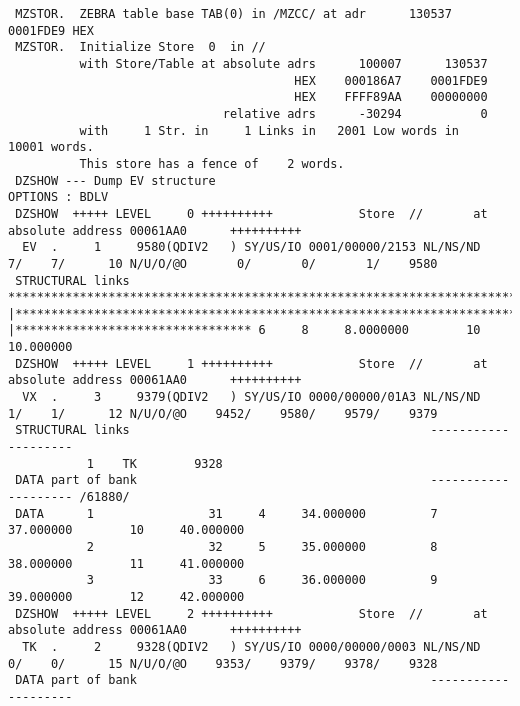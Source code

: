 \begin{Listing}\begin{verbatim}
 MZSTOR.  ZEBRA table base TAB(0) in /MZCC/ at adr      130537    0001FDE9 HEX
 MZSTOR.  Initialize Store  0  in //
          with Store/Table at absolute adrs      100007      130537
                                        HEX    000186A7    0001FDE9
                                        HEX    FFFF89AA    00000000
                              relative adrs      -30294           0
          with     1 Str. in     1 Links in   2001 Low words in   10001 words.
          This store has a fence of    2 words.
 DZSHOW --- Dump EV structure                                                                       OPTIONS : BDLV
 DZSHOW  +++++ LEVEL     0 ++++++++++            Store  //       at absolute address 00061AA0      ++++++++++
  EV  .     1     9580(QDIV2   ) SY/US/IO 0001/00000/2153 NL/NS/ND    7/    7/      10 N/U/O/@O       0/       0/       1/    9580
 STRUCTURAL links               ********************************************************************************************************************************************************************************************************************************
|***************************************************************************************************************************************************************************************************************************************************************
|********************************* 6     8     8.0000000        10     10.000000
 DZSHOW  +++++ LEVEL     1 ++++++++++            Store  //       at absolute address 00061AA0      ++++++++++
  VX  .     3     9379(QDIV2   ) SY/US/IO 0000/00000/01A3 NL/NS/ND    1/    1/      12 N/U/O/@O    9452/    9580/    9579/    9379
 STRUCTURAL links                                          --------------------
           1    TK        9328
 DATA part of bank                                         -------------------- /61880/
 DATA      1                31     4     34.000000         7     37.000000        10     40.000000
           2                32     5     35.000000         8     38.000000        11     41.000000
           3                33     6     36.000000         9     39.000000        12     42.000000
 DZSHOW  +++++ LEVEL     2 ++++++++++            Store  //       at absolute address 00061AA0      ++++++++++
  TK  .     2     9328(QDIV2   ) SY/US/IO 0000/00000/0003 NL/NS/ND    0/    0/      15 N/U/O/@O    9353/    9379/    9378/    9328
 DATA part of bank                                         --------------------

\end{verbatim}
\end{Listing}
